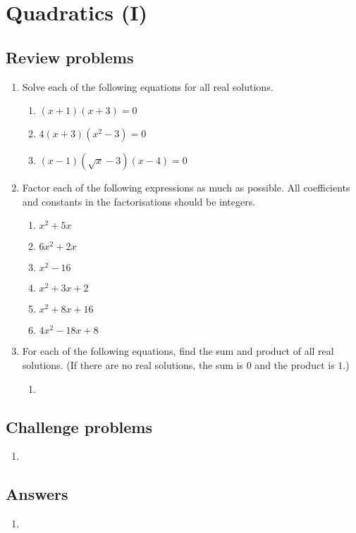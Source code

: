 \section{Quadratics (I)}

\subsection{Review problems}

\begin{enumerate}
\item Solve each of the following equations for all real solutions.
\begin{enumerate}
\item $(x + 1)(x + 3) = 0$
\item $4(x + 3)(x^2 - 3) = 0$
\item $(x - 1)(\sqrt{x} - 3)(x - 4) = 0$
\end{enumerate}
\item Factor each of the following expressions as much as possible. All coefficients and constants in the factorisations should be integers.
\begin{enumerate}
\item $x^2 + 5x$
\item $6x^2 + 2x$
\item $x^2 - 16$
\item $x^2 + 3x + 2$
\item $x^2 + 8x + 16$
\item $4x^2 - 18x + 8$
\end{enumerate}
\item For each of the following equations, find the sum and product of all real solutions. (If there are no real solutions, the sum is $0$ and the product is $1$.)
\begin{enumerate}
\item 
\end{enumerate} 
\end{enumerate}


\subsection{Challenge problems}

\begin{enumerate}[resume]
\item 
\end{enumerate}


\subsection{Answers}

\begin{enumerate}
\item 
\end{enumerate}